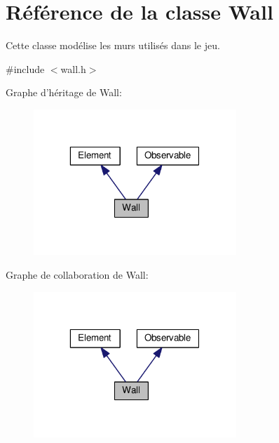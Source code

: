 \hypertarget{classWall}{\section{Référence de la classe Wall}
\label{classWall}
}


Cette classe modélise les murs utilisés dans le jeu.  




{\ttfamily \#include $<$wall.\+h$>$}



Graphe d'héritage de Wall\+:
\nopagebreak
\begin{figure}[H]
\begin{center}
\leavevmode
\includegraphics[width=217pt]{de/d28/classWall__inherit__graph}
\end{center}
\end{figure}


Graphe de collaboration de Wall\+:
\nopagebreak
\begin{figure}[H]
\begin{center}
\leavevmode
\includegraphics[width=217pt]{d9/d82/classWall__coll__graph}
\end{center}
\end{figure}
